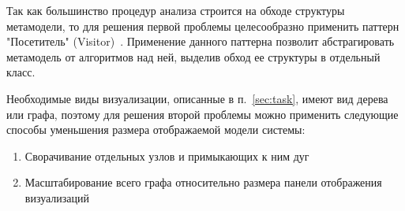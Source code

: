 Так как большинство процедур анализа строится на обходе структуры метамодели, то
для решения первой проблемы целесообразно применить паттерн "Посетитель"
(Visitor)~\cite{Gamma94}. Применение данного паттерна позволит абстрагировать
метамодель от алгоритмов над ней, выделив обход ее структуры в отдельный класс.

Необходимые виды визуализации, описанные в п.~\ref{sec:task}, имеют вид дерева
или графа, поэтому для решения второй проблемы можно применить следующие способы
уменьшения размера отображаемой модели системы:

\begin{enumerate}
    \item Сворачивание отдельных узлов и примыкающих к ним дуг
    \item Масштабирование всего графа относительно размера панели отображения
    визуализаций
\end{enumerate}
